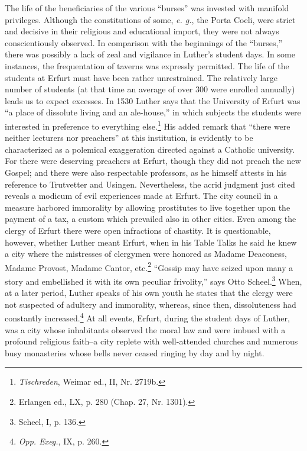 The life of the beneficiaries of the various “burses” was invested
with manifold privileges. Although the constitutions of some, \textit{e. g.},
the Porta Coeli, were strict and decisive in their religious and educational import, they were not always conscientiously observed. In comparison with the beginnings of the “burses,” there was possibly a lack
of zeal and vigilance in Luther’s student days. In some instances, the
frequentation of taverns was expressly permitted. The life of the
students at Erfurt must have been rather unrestrained. The relatively
large number of students (at that time an average of over 300 were
enrolled annually) leads us to expect excesses. In 1530 Luther says
that the University of Erfurt was “a place of dissolute living and an
ale-house,” in which subjects the students were interested in preference
to everything else.\footnote{\textit{Tischreden}, Weimar ed., II, Nr. 2719b.}
His added remark that “there were neither lecturers
nor preachers” at this institution, is evidently to be characterized as
a polemical exaggeration directed against a Catholic university. For
there were deserving preachers at Erfurt, though they did not preach
the new Gospel; and there were also respectable professors, as he
himself attests in his reference to Trutvetter and Usingen. Nevertheless, the acrid judgment just cited reveals a modicum of evil experiences made at Erfurt. The city council in a measure harbored immorality by allowing prostitutes to live together upon the payment
of a tax, a custom which prevailed also in other cities. Even among
the clergy of Erfurt there were open infractions of chastity. It is
questionable, however, whether Luther meant Erfurt, when in his
Table Talks he said he knew a city where the mistresses of clergymen
were honored as Madame Deaconess, Madame Provost, Madame Cantor, etc.\footnote{Erlangen ed., LX, p. 280 (Chap. 27, Nr. 1301).}
“Gossip may have seized upon many a story and embellished it with its own peculiar frivolity,” says Otto Scheel.\footnote{Scheel, I, p. 136.}
When, at a later period, Luther speaks of his own youth he states that the
clergy were not suspected of adultery and immorality, whereas, since
then, dissoluteness had constantly increased.\footnote{\textit{Opp. Exeg.}, IX, p. 260.}
At all events, Erfurt,
during the student days of Luther, was a city whose inhabitants observed
the moral law and were imbued with a profound religious
faith--a city replete with well-attended churches and numerous busy
monasteries whose bells never ceased ringing by day and by night.

